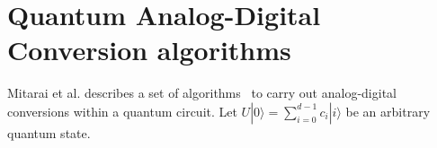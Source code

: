\documentclass[a4paper,twocolumn,11pt,unpublished]{quantumarticle}
\newcommand{\rang}{\rangle}
\begin{document}




\appendix
\onecolumn

\section{Quantum Analog-Digital Conversion algorithms}\label{app:QADC}
Mitarai et al. describes a set of algorithms~\cite{Mitarai2019} to carry out analog-digital conversions within a quantum circuit. Let $U|0\rangle = \sum_{i=0}^{d-1} c_i |i\rang$ be an arbitrary quantum state.
    
\end{document}
